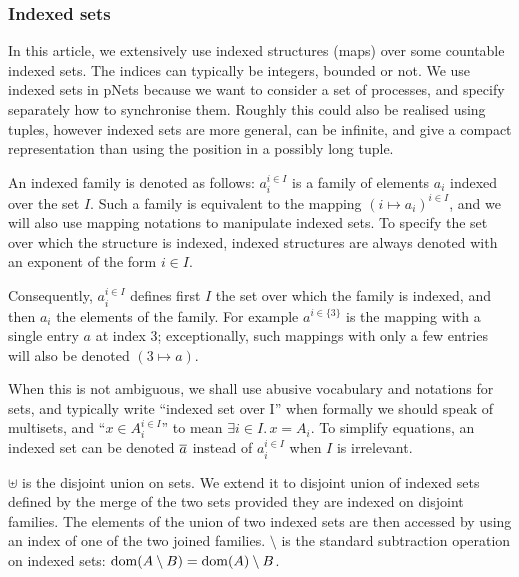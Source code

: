 \documentclass{lmcs}
\begin{document}
\subsubsection*{Indexed sets}



In this article, we extensively use indexed structures
(maps) over some countable indexed sets.   The indices can typically be
integers, bounded or not. We use indexed sets in pNets because we want to consider a set of processes, and specify separately how to synchronise them. Roughly this could also be realised using tuples, however indexed sets are more general, can be infinite, and give a compact representation than using the position in a possibly long tuple.

An indexed family is denoted as
follows: $a_i^{i\in I}$ is a family of elements $a_i$ indexed over the
set $I$. Such a family
is equivalent to the mapping $(i\mapsto a_i)^{i\in I}$, and we will also use mapping 
notations to manipulate indexed sets.
To specify the set over which the structure is indexed, 
indexed structures are always denoted with an exponent of the form $i\in I$.

Consequently, $a_i^{i\in I}$ defines first $I$ the set over which the
family is indexed, and then $a_i$ the elements of the family.
For example $a^{i\in\{3\}}$ is
the mapping with a single entry $a$ at index $3$; exceptionally, such mappings with
only a few entries will also be denoted $(3\mapsto a)$.

When this is not ambiguous, we shall use abusive vocabulary and
notations for sets, and typically write ``indexed set over I'' when  
formally we should speak of multisets, and ``$x\in
A_i^{i\in I}$'' to mean $\exists i\in I.\, x=A_i$.
To simplify equations, an indexed set can be denoted $\overline{a}$
instead of $a_i^{i\in I}$ when $I$ is irrelevant.

$\uplus$ is the disjoint union on sets. We extend it to  disjoint union  of indexed 
sets defined by the merge of the 
two sets provided they are indexed on disjoint families.
The elements
of the union of two indexed sets are then accessed by using an index of one of the two
joined families.
$\setminus$ is the standard subtraction operation on indexed sets: $\operatorname{dom}(A\setminus B)=\operatorname{dom}(A)\setminus B$.
\end{document}
